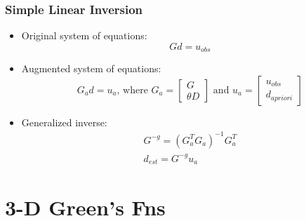 \documentclass{beamer}
\begin{document}
\begin{frame}
  \frametitle{Simple Linear Inversion}

  \begin{itemize}
  \item Original system of equations:
    \begin{equation}
      G d = u_{obs}
    \end{equation}

  \item Augmented system of equations:
    \begin{equation}
      G_a d = u_a \text{, where } 
      G_a = \left[ \begin{array}{c} G \\ \theta D \end{array} \right]
      \text{ and }
      u_a = \left[ \begin{array}{c} u_{obs} \\ d_{apriori} \end{array} \right]
    \end{equation}
    
  \item Generalized inverse:
    \begin{gather}
      G^{-g} = \left( G_a^T G_a \right)^{-1} G_a^T \\
      d_{est} = G^{-g} u_a
    \end{gather}
  \end{itemize}
  
\end{frame}


\section{3-D Green's Fns}
\end{document}
